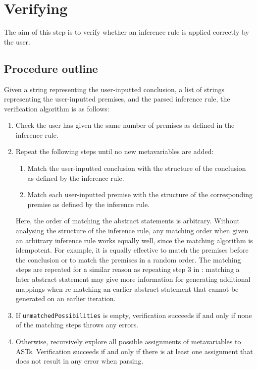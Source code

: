 \section{Verifying}
\label{checking:verifying}
The aim of this step is to verify whether an inference rule is applied correctly by the user.

\subsection{Procedure outline}
Given a string representing the user-inputted conclusion, a list of strings representing the user-inputted premises, and the parsed inference rule, the verification algorithm is as follows:
\begin{enumerate}
    \item Check the user has given the same number of premises as defined in the inference rule.
    \item Repeat the following steps until no new metavariables are added:
    \begin{enumerate}
        \item Match the user-inputted conclusion with the structure of the conclusion as defined by the inference rule.
        \item Match each user-inputted premise with the structure of the corresponding premise as defined by the inference rule.
    \end{enumerate}
    Here, the order of matching the abstract statements is arbitrary. Without analysing the structure of the inference rule, any matching order when given an arbitrary inference rule works equally well, since the matching algorithm is idempotent. For example, it is equally effective to match the premises before the conclusion or to match the premises in a random order. The matching steps are repeated for a similar reason as repeating step 3 in : matching a later abstract statement may give more information for generating additional mappings when re-matching an earlier abstract statement that cannot be generated on an earlier iteration.
    \item If \lstinline{unmatchedPossibilities} is empty, verification succeeds if and only if none of the matching steps throws any errors.
    \item Otherwise, recursively explore all possible assignments of metavariables to ASTs. Verification succeeds if and only if there is at least one assignment that does not result in any error when parsing.
\end{enumerate}